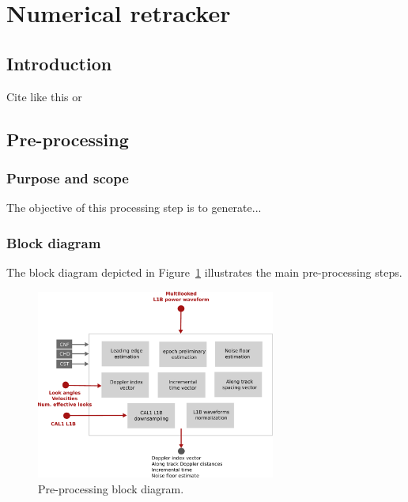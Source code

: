 \documentclass[11pt,a4paper]{article}
\begin{document}
\clearpage
\newpage
\section{Numerical retracker}\label{sec:retracker}


\subsection{Introduction}\label{sec:retracker_intro}

Cite like this \citep{Ray2015a} or \citep{Ray2015a,Nelder1965}

\subsection{Pre-processing}\label{sec:pre-processing}

\subsubsection{Purpose and scope}

The objective of this processing step is to generate...

\subsubsection{Block diagram}

The block diagram depicted in Figure~\ref{fig:L2_preprocessing_blockdiagram} illustrates the main pre-processing steps.

\begin{figure}[htb!]\centering
  \centering
  \includegraphics[width=0.7\textwidth]{fig/L2_preprocessing_blockdiagram}
  \caption[Pre-processing block diagram]{Pre-processing block diagram.}
  \label{fig:L2_preprocessing_blockdiagram}
\end{figure}
\end{document}
